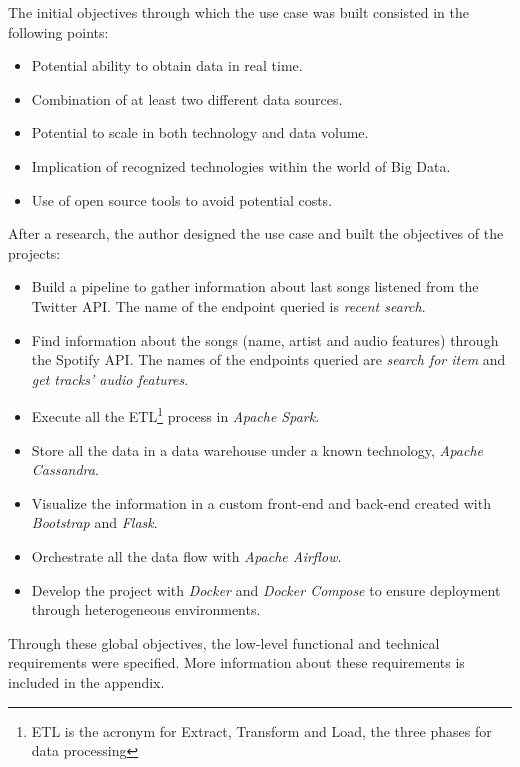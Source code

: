 
\nonzeroparskip The initial objectives through which the use case was built consisted in the following points:
\begin{itemize}
	\item Potential ability to obtain data in real time.
	\item Combination of at least two different data sources.
	\item Potential to scale in both technology and data volume.
	\item Implication of recognized technologies within the world of Big Data.
	\item Use of open source tools to avoid potential costs.
\end{itemize}

\nonzeroparskip After a research, the author designed the use case and built the objectives of the projects:
\begin{itemize}
	\item Build a pipeline to gather information about last songs listened from the Twitter API. The name of the endpoint queried is \textit{recent search}.
	\item Find information about the songs (name, artist and audio features) through the Spotify API. The names of the endpoints queried are \textit{search for item} and \textit{get tracks' audio features}.
	\item Execute all the ETL\footnote{ETL is the acronym for Extract, Transform and Load, the three phases for data processing} process in \textit{Apache Spark}.
	\item Store all the data in a data warehouse under a known technology, \textit{Apache Cassandra}.
	\item Visualize the information in a custom front-end and back-end created with \textit{Bootstrap} and \textit{Flask}.
	\item Orchestrate all the data flow with \textit{Apache Airflow}.
	\item Develop the project with \textit{Docker} and \textit{Docker Compose} to ensure deployment through heterogeneous environments.
\end{itemize}

\nonzeroparskip Through these global objectives, the low-level functional and technical requirements were specified. More information about these requirements is included in the appendix.